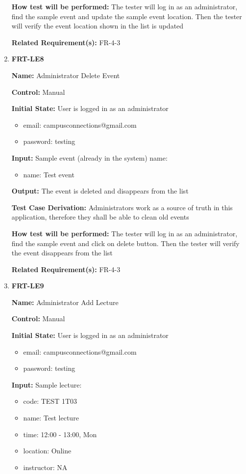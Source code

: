 \documentclass[12pt, titlepage]{article}
\begin{document}
\begin{enumerate}
\textbf{How test will be performed:} The tester will log in as an administrator, find the sample event and update the sample event location. Then the tester will verify the event location shown in the list is updated

\textbf{Related Requirement(s):} FR-4-3

\item{\textbf{FRT-LE8}}

\textbf{Name:} Administrator Delete Event

\textbf{Control:} Manual
					
\textbf{Initial State:} User is logged in as an administrator
\begin{itemize}
\item email: campusconnections@gmail.com
\item password: testing
\end{itemize}

\textbf{Input:} Sample event (already in the system) name:
\begin{itemize}
\item name: Test event
\end{itemize}
					
\textbf{Output:} The event is deleted and disappears from the list

\textbf{Test Case Derivation:} Administrators work as a source of truth in this application, therefore they shall be able to clean old events
					
\textbf{How test will be performed:} The tester will log in as an administrator, find the sample event and click on delete button. Then the tester will verify the event disappears from the list

\textbf{Related Requirement(s):} FR-4-3

\item{\textbf{FRT-LE9}}

\textbf{Name:} Administrator Add Lecture

\textbf{Control:} Manual
					
\textbf{Initial State:} User is logged in as an administrator
\begin{itemize}
\item email: campusconnections@gmail.com
\item password: testing
\end{itemize}

\textbf{Input:} Sample lecture:
\begin{itemize}
\item code: TEST 1T03
\item name: Test lecture
\item time: 12:00 - 13:00, Mon
\item location: Online
\item instructor: NA
\end{itemize}
					

\end{enumerate}
\end{document}
